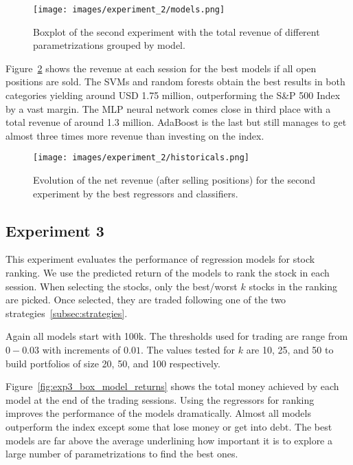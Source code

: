 \begin{figure}
    \centering
    \texttt{[image: images/experiment\_2/models.png]}
    \caption{\small Boxplot of the second experiment with the total revenue of different parametrizations grouped by model.}
    \label{fig:exp2_box_model_returns}
\end{figure}

Figure~\ref{fig:exp2_hist_model_returns} shows the revenue at each session for the best models if all open positions are sold. The SVMs and random forests obtain the best results in both categories yielding around USD 1.75 million,
    outperforming the S\&P 500 Index by a vast margin.
The MLP neural network comes close in third place with a total revenue of around 1.3 million. AdaBoost is the last but still manages to get almost three times more revenue than investing on the index.

    
\begin{figure}
    \centering
    \texttt{[image: images/experiment\_2/historicals.png]}
    \caption{\small Evolution of the net revenue (after selling positions) for the second experiment by the best regressors and classifiers.}
    \label{fig:exp2_hist_model_returns}
\end{figure}



\subsection{Experiment 3}

This experiment evaluates the performance of regression models for stock ranking. We use the predicted return of the models to rank the stock in each session. When selecting the stocks, only the best/worst $k$ stocks in the ranking are picked. Once selected, they are traded following one of the two strategies~\ref{subsec:strategies}.

Again all models start with 100k. The thresholds used for trading are range from $0 - 0.03$ with increments of $0.01$. The values tested for $k$ are 10, 25, and 50 to build portfolios of size 20, 50, and 100 respectively.

Figure~\ref{fig:exp3_box_model_returns} shows the total money achieved by each model at the end of the trading sessions. Using the regressors for ranking improves the performance of the models dramatically. Almost all models outperform the index except some that lose money or get into debt. The best models are far above the average underlining how important it is to explore a large number of parametrizations to find the best ones. 

